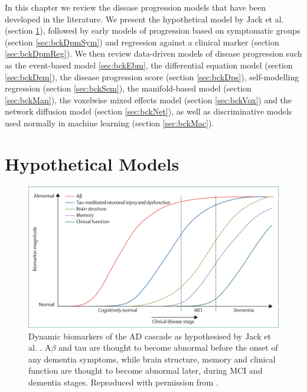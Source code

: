 In this chapter we review the disease progression models that have been developed in the literature. We present the hypothetical model by Jack et al. \cite{jack2010hypothetical} (section \ref{sec:bckDpmHyp}), followed by early models of progression based on symptomatic groups (section \ref{sec:bckDpmSym}) and regression against a clinical marker (section \ref{sec:bckDpmReg}). We then review data-driven models of disease progression such as the event-based model \ref{sec:bckEbm}, the differential equation model (section \ref{sec:bckDem}), the disease progression score (section \ref{sec:bckDps}), self-modelling regression (section \ref{sec:bckSem}), the manifold-based model (section \ref{sec:bckMan}), the voxelwise mixed effects model (section \ref{sec:bckVox}) and the network diffusion model (section \ref{sec:bckNet}), as well as discriminative models used normally in machine learning (section \ref{sec:bckMac}).

\section{Hypothetical Models}
\label{sec:bckDpmHyp}

\begin{figure}
 \centering
 \includegraphics[scale=0.85,trim=5 5 5 5,clip]{images/jackCurves}
 \caption[Biomarker cascade by Jack et al. \cite{jack2010hypothetical}]{Dynamic biomarkers of the AD cascade as hypothesised by Jack et al. \cite{jack2010hypothetical}. A$\beta$ and tau are thought to become abnormal before the onset of any dementia symptoms, while brain structure, memory and clinical function are thought to become abnormal later, during MCI and dementia stages. Reproduced with permission from \cite{jack2010hypothetical}.}
 \label{fig:biomk_cascade}
\end{figure}

